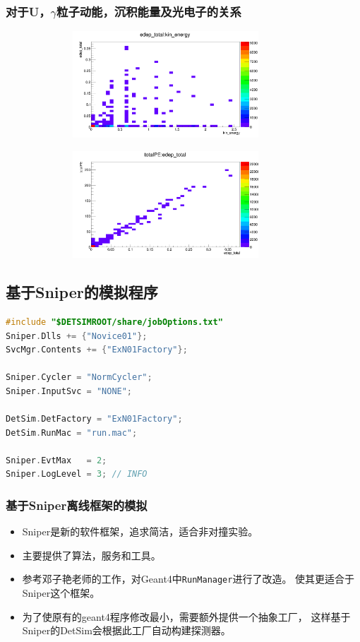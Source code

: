 \begin{frame}
    \frametitle{对于U，$\gamma$粒子动能，沉积能量及光电子的关系}
    \includegraphics[width=12cm,height=4cm]{data/U_gamma_edep_vs_kine.png}

    \includegraphics[width=12cm,height=4cm]{data/U_gamma_totalPE_vs_edep.png}
\end{frame}

\subsection{基于Sniper的模拟程序}

\newsavebox{\NoviceJobOptions}
\begin{lrbox}{\NoviceJobOptions}
\begin{lstlisting}[language=c++]
#include "$DETSIMROOT/share/jobOptions.txt"
Sniper.Dlls += {"Novice01"};
SvcMgr.Contents += {"ExN01Factory"};

Sniper.Cycler = "NormCycler";
Sniper.InputSvc = "NONE";

DetSim.DetFactory = "ExN01Factory";
DetSim.RunMac = "run.mac";

Sniper.EvtMax   = 2;
Sniper.LogLevel = 3; // INFO
\end{lstlisting}
\end{lrbox}


\begin{frame}
    \frametitle{基于Sniper离线框架的模拟}
    \begin{itemize}
        \item Sniper是新的软件框架，追求简洁，适合非对撞实验。
        \item 主要提供了算法，服务和工具。
        \item 参考邓子艳老师的工作，对Geant4中{\tt RunManager}进行了改造。
              使其更适合于Sniper这个框架。
        \item 为了使原有的geant4程序修改最小，需要额外提供一个抽象工厂，
              这样基于Sniper的DetSim会根据此工厂自动构建探测器。
    \end{itemize}
    \par\usebox{\NoviceJobOptions}
\end{frame}

